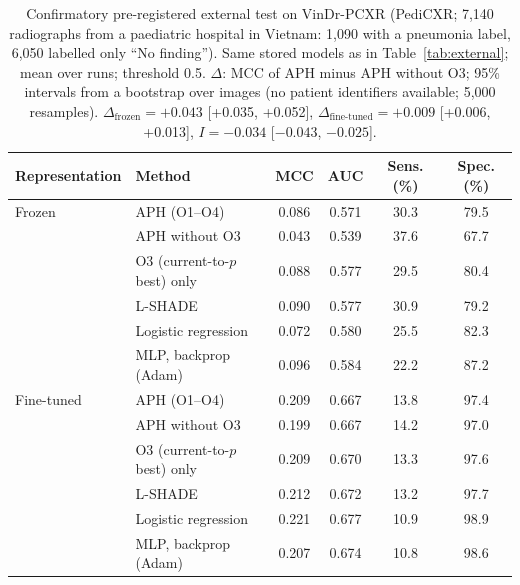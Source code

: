 \begin{table}[!t]
\centering
\caption{Confirmatory pre-registered external test on VinDr-PCXR (PediCXR; 7,140 radiographs from a paediatric hospital in Vietnam: 1,090 with a pneumonia label, 6,050 labelled only ``No finding''). Same stored models as in Table~\ref{tab:external}; mean over runs; threshold 0.5. $\Delta$: MCC of APH minus APH without O3; 95\% intervals from a bootstrap over images (no patient identifiers available; 5,000 resamples). $\Delta_{\mathrm{frozen}}=+0.043$ [+0.035, +0.052], $\Delta_{\mathrm{fine\text{-}tuned}}=+0.009$ [+0.006, +0.013], $I=-0.034$ [$-0.043$, $-0.025$].}
\label{tab:pedicxr}
\footnotesize
\setlength{\tabcolsep}{4pt}
\begin{tabular}{llcccc}
\toprule
Representation & Method & MCC & AUC & Sens. (\%) & Spec. (\%) \\
\midrule
Frozen & APH (O1--O4) & 0.086 & 0.571 & 30.3 & 79.5 \\
 & APH without O3 & 0.043 & 0.539 & 37.6 & 67.7 \\
 & O3 (current-to-$p$best) only & 0.088 & 0.577 & 29.5 & 80.4 \\
 & L-SHADE & 0.090 & 0.577 & 30.9 & 79.2 \\
 & Logistic regression & 0.072 & 0.580 & 25.5 & 82.3 \\
 & MLP, backprop (Adam) & 0.096 & 0.584 & 22.2 & 87.2 \\
\midrule
Fine-tuned & APH (O1--O4) & 0.209 & 0.667 & 13.8 & 97.4 \\
 & APH without O3 & 0.199 & 0.667 & 14.2 & 97.0 \\
 & O3 (current-to-$p$best) only & 0.209 & 0.670 & 13.3 & 97.6 \\
 & L-SHADE & 0.212 & 0.672 & 13.2 & 97.7 \\
 & Logistic regression & 0.221 & 0.677 & 10.9 & 98.9 \\
 & MLP, backprop (Adam) & 0.207 & 0.674 & 10.8 & 98.6 \\
\bottomrule
\end{tabular}
\end{table}
